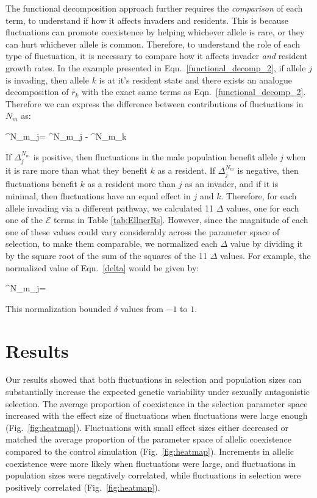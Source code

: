 \documentclass[12pt]{article}
\let\oldequation\equation
\let\oldendequation\endequation
\renewenvironment{equation}
  {\linenomathNonumbers\oldequation}
  {\oldendequation\endlinenomath}
\begin{document}
The functional decomposition approach further requires the \textit{comparison} of each term, to understand if how it affects invaders and residents. This is because fluctuations can promote coexistence by helping whichever allele is rare, or they can hurt whichever allele is common. Therefore, to understand the role of each type of fluctuation, it is necessary to compare how it affects invader \textit{and} resident growth rates. In the example presented in Eqn.~\ref{functional_decomp_2}, if allele $j$ is invading, then allele $k$ is at it's resident state and there exists an analogue decomposition of $\overline{r}_{k}$ with the exact same terms as Eqn.~\ref{functional_decomp_2}. Therefore we can express the difference between contributions of fluctuations in $N_{m}$ as:


\begin{equation}
\Delta^{N_{m}}_{j}= ^{N_{m}}_{j} - ^{N_{m}}_{k}
\label{delta}
\end{equation}

If $\Delta^{N_{m}}_{j}$ is positive, then fluctuations in the male population benefit allele $j$ when it is rare more than what they benefit $k$ as a resident. If $\Delta^{N_{m}}_{j}$ is negative, then fluctuations benefit $k$ as a resident more than $j$ as an invader, and if it is minimal, then fluctuations have an equal effect in $j$ and $k$. Therefore, for each allele invading via a different pathway, we calculated 11 $\Delta$ values, one for each one of the $\mathcal{E}$ terms in Table \ref{tab:EllnerRs}. However, since the magnitude of each one of these values could vary considerably across the parameter space of selection, to make them comparable, we normalized each $\Delta$ value by dividing it by the square root of the sum of the squares of the 11 $\Delta$ values. For example, the normalized value of Eqn.~\ref{delta} would be given by:



\begin{equation}
  \delta^{N_{m}}_{j}= 
\end{equation}

This normalization bounded $\delta$ values from $-1$ to $1$.

\section{Results}
Our results showed that both fluctuations in selection and population sizes can substantially increase the expected genetic variability under sexually antagonistic selection. The average proportion of coexistence in the selection parameter space increased with the effect size of fluctuations when fluctuations were large enough (Fig.~\ref{fig:heatmap}). Fluctuations with small effect sizes either decreased or matched the average proportion of the parameter space of allelic coexistence compared to the control simulation (Fig.~\ref{fig:heatmap}). Increments in allelic coexistence were more likely when fluctuations were large, and fluctuations in population sizes were negatively correlated, while fluctuations in selection were positively correlated (Fig.~\ref{fig:heatmap}).
\end{document}
